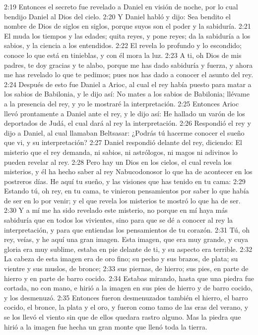 2:19 Entonces el secreto fue revelado a Daniel en visión de noche, por lo cual bendijo Daniel al Dios del cielo. 
2:20 Y Daniel habló y dijo: Sea bendito el nombre de Dios de siglos en siglos, porque suyos son el poder y la sabiduría. 
2:21 El muda los tiempos y las edades; quita reyes, y pone reyes; da la sabiduría a los sabios, y la ciencia a los entendidos. 
2:22 El revela lo profundo y lo escondido; conoce lo que está en tinieblas, y con él mora la luz. 
2:23 A ti, oh Dios de mis padres, te doy gracias y te alabo, porque me has dado sabiduría y fuerza, y ahora me has revelado lo que te pedimos; pues nos has dado a conocer el asunto del rey. 
2:24 Después de esto fue Daniel a Arioc, al cual el rey había puesto para matar a los sabios de Babilonia, y le dijo así: No mates a los sabios de Babilonia; llévame a la presencia del rey, y yo le mostraré la interpretación. 
2:25 Entonces Arioc llevó prontamente a Daniel ante el rey, y le dijo así: He hallado un varón de los deportados de Judá, el cual dará al rey la interpretación. 
2:26 Respondió el rey y dijo a Daniel, al cual llamaban Beltsasar: ¿Podrás tú hacerme conocer el sueño que vi, y su interpretación? 
2:27 Daniel respondió delante del rey, diciendo: El misterio que el rey demanda, ni sabios, ni astrólogos, ni magos ni adivinos lo pueden revelar al rey. 
2:28 Pero hay un Dios en los cielos, el cual revela los misterios, y él ha hecho saber al rey Nabucodonosor lo que ha de acontecer en los postreros días. He aquí tu sueño, y las visiones que has tenido en tu cama: 
2:29 Estando tú, oh rey, en tu cama, te vinieron pensamientos por saber lo que había de ser en lo por venir; y el que revela los misterios te mostró lo que ha de ser. 
2:30 Y a mí me ha sido revelado este misterio, no porque en mí haya más sabiduría que en todos los vivientes, sino para que se dé a conocer al rey la interpretación, y para que entiendas los pensamientos de tu corazón. 
2:31 Tú, oh rey, veías, y he aquí una gran imagen. Esta imagen, que era muy grande, y cuya gloria era muy sublime, estaba en pie delante de ti, y su aspecto era terrible. 
2:32 La cabeza de esta imagen era de oro fino; su pecho y sus brazos, de plata; su vientre y sus muslos, de bronce; 
2:33 sus piernas, de hierro; sus pies, en parte de hierro y en parte de barro cocido. 
2:34 Estabas mirando, hasta que una piedra fue cortada, no con mano, e hirió a la imagen en sus pies de hierro y de barro cocido, y los desmenuzó. 
2:35 Entonces fueron desmenuzados también el hierro, el barro cocido, el bronce, la plata y el oro, y fueron como tamo de las eras del verano, y se los llevó el viento sin que de ellos quedara rastro alguno. Mas la piedra que hirió a la imagen fue hecha un gran monte que llenó toda la tierra. 
